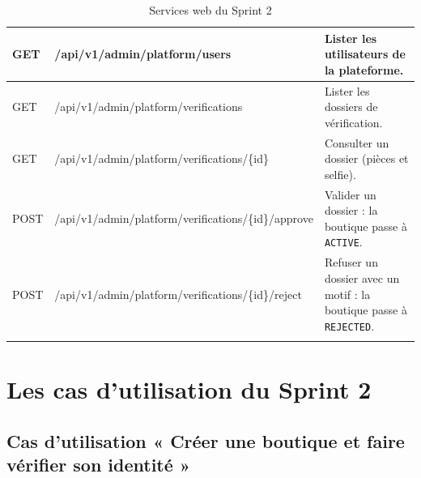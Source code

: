 \begin{longtable}{|p{1.5cm}|p{6.8cm}|p{6.2cm}|}
\hline
GET & /api/v1/admin/platform/users & Lister les utilisateurs de la plateforme. \\
\hline
GET & /api/v1/admin/platform/verifications & Lister les dossiers de vérification. \\
\hline
GET & /api/v1/admin/platform/verifications/\{id\} & Consulter un dossier (pièces et selfie). \\
\hline
POST & /api/v1/admin/platform/verifications/\{id\}/approve & Valider un dossier : la boutique passe à \texttt{ACTIVE}. \\
\hline
POST & /api/v1/admin/platform/verifications/\{id\}/reject & Refuser un dossier avec un motif : la boutique passe à \texttt{REJECTED}. \\
\hline
\caption{Services web du Sprint 2}
\label{tab:ws-sprint2}
\end{longtable}

\section{Les cas d'utilisation du Sprint 2}
\subsection{Cas d'utilisation « Créer une boutique et faire vérifier son identité »}
